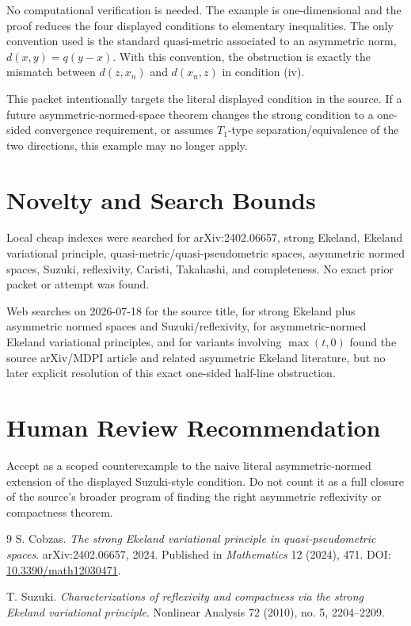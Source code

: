 \documentclass[11pt]{article}
\begin{document}
No computational verification is needed.  The example is one-dimensional and
the proof reduces the four displayed conditions to elementary inequalities.
The only convention used is the standard quasi-metric associated to an
asymmetric norm, \(d(x,y)=q(y-x)\).  With this convention, the obstruction is
exactly the mismatch between \(d(z,x_n)\) and \(d(x_n,z)\) in condition (iv).

This packet intentionally targets the literal displayed condition in the
source.  If a future asymmetric-normed-space theorem changes the strong
condition to a one-sided convergence requirement, or assumes \(T_1\)-type
separation/equivalence of the two directions, this example may no longer
apply.

\section*{Novelty and Search Bounds}

Local cheap indexes were searched for arXiv:2402.06657, strong Ekeland,
Ekeland variational principle, quasi-metric/quasi-pseudometric spaces,
asymmetric normed spaces, Suzuki, reflexivity, Caristi, Takahashi, and
completeness.  No exact prior packet or attempt was found.

Web searches on 2026-07-18 for the source title, for strong Ekeland plus
asymmetric normed spaces and Suzuki/reflexivity, for asymmetric-normed
Ekeland variational principles, and for variants involving \(\max(t,0)\)
found the source arXiv/MDPI article and related asymmetric Ekeland
literature, but no later explicit resolution of this exact one-sided
half-line obstruction.

\section*{Human Review Recommendation}

Accept as a scoped counterexample to the naive literal asymmetric-normed
extension of the displayed Suzuki-style condition.  Do not count it as a full
closure of the source's broader program of finding the right asymmetric
reflexivity or compactness theorem.

\begin{thebibliography}{9}
S. Cobzas.
\emph{The strong Ekeland variational principle in quasi-pseudometric spaces}.
arXiv:2402.06657, 2024.  Published in \emph{Mathematics} 12 (2024), 471.
DOI: \href{https://doi.org/10.3390/math12030471}{10.3390/math12030471}.

T. Suzuki.
\emph{Characterizations of reflexivity and compactness via the strong
Ekeland variational principle}. Nonlinear Analysis 72 (2010), no. 5,
2204--2209.
\end{thebibliography}
\end{document}
